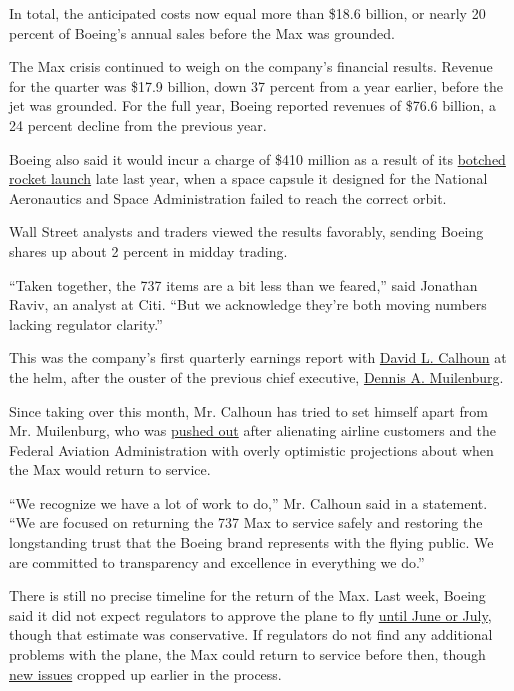In total, the anticipated costs now equal more than \$18.6 billion, or
nearly 20 percent of Boeing's annual sales before the Max was grounded.

The Max crisis continued to weigh on the company's financial results.
Revenue for the quarter was \$17.9 billion, down 37 percent from a year
earlier, before the jet was grounded. For the full year, Boeing reported
revenues of \$76.6 billion, a 24 percent decline from the previous year.

Boeing also said it would incur a charge of \$410 million as a result of
its
\href{https://www.nytimes3xbfgragh.onion/2019/12/20/science/boeing-starliner-launch.html}{botched
rocket launch} late last year, when a space capsule it designed for the
National Aeronautics and Space Administration failed to reach the
correct orbit.

Wall Street analysts and traders viewed the results favorably, sending
Boeing shares up about 2 percent in midday trading.

``Taken together, the 737 items are a bit less than we feared,'' said
Jonathan Raviv, an analyst at Citi. ``But we acknowledge they're both
moving numbers lacking regulator clarity.''

This was the company's first quarterly earnings report with
\href{https://www.nytimes3xbfgragh.onion/2019/12/23/business/david-calhoun.html}{David
L. Calhoun} at the helm, after the ouster of the previous chief
executive,
\href{https://www.nytimes3xbfgragh.onion/2019/12/22/business/boeing-dennis-muilenburg-737-max.html?action=click\&module=RelatedLinks\&pgtype=Article}{Dennis
A. Muilenburg}.

Since taking over this month, Mr. Calhoun has tried to set himself apart
from Mr. Muilenburg, who was
\href{https://www.nytimes3xbfgragh.onion/2019/12/23/business/Boeing-ceo-muilenburg.html}{pushed
out} after alienating airline customers and the Federal Aviation
Administration with overly optimistic projections about when the Max
would return to service.

``We recognize we have a lot of work to do,'' Mr. Calhoun said in a
statement. ``We are focused on returning the 737 Max to service safely
and restoring the longstanding trust that the Boeing brand represents
with the flying public. We are committed to transparency and excellence
in everything we do.''

There is still no precise timeline for the return of the Max. Last week,
Boeing said it did not expect regulators to approve the plane to fly
\href{https://www.nytimes3xbfgragh.onion/2020/01/21/business/boeing-737-max.html}{until
June or July}, though that estimate was conservative. If regulators do
not find any additional problems with the plane, the Max could return to
service before then, though
\href{https://www.nytimes3xbfgragh.onion/2020/01/05/business/boeing-737-max.html}{new
issues} cropped up earlier in the process.

